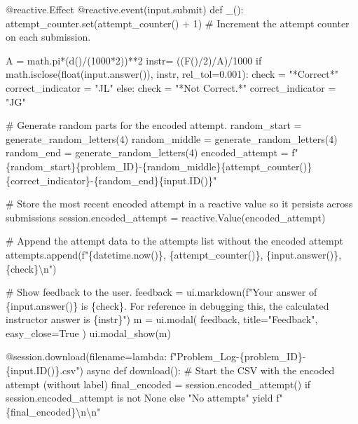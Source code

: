 \documentclass[
  letterpaper,
  DIV=11,
  numbers=noendperiod]{scrreprt}
\newenvironment{Shaded}{\begin{snugshade}}{\end{snugshade}}
\newcommand{\NormalTok}[1]{\textcolor[rgb]{0.00,0.23,0.31}{#1}}
\begin{document}
\begin{Shaded}
\begin{Highlighting}[]
\NormalTok{    @reactive.Effect}
\NormalTok{    @reactive.event(input.submit)}
\NormalTok{    def \_():}
\NormalTok{        attempt\_counter.set(attempt\_counter() + 1)  \# Increment the attempt counter on each submission.  }
      
\NormalTok{        A = math.pi*(d()/(1000*2))**2}
\NormalTok{        instr= ((F()/2)/A)/1000}
\NormalTok{        if math.isclose(float(input.answer()), instr, rel\_tol=0.001):}
\NormalTok{            check = "*Correct*"}
\NormalTok{            correct\_indicator = "JL"}
\NormalTok{        else:}
\NormalTok{            check = "*Not Correct.*"}
\NormalTok{            correct\_indicator = "JG"}

\NormalTok{        \# Generate random parts for the encoded attempt.}
\NormalTok{        random\_start = generate\_random\_letters(4)}
\NormalTok{        random\_middle = generate\_random\_letters(4)}
\NormalTok{        random\_end = generate\_random\_letters(4)}
\NormalTok{        encoded\_attempt = f"\{random\_start\}\{problem\_ID\}{-}\{random\_middle\}\{attempt\_counter()\}\{correct\_indicator\}{-}\{random\_end\}\{input.ID()\}"}

\NormalTok{        \# Store the most recent encoded attempt in a reactive value so it persists across submissions}
\NormalTok{        session.encoded\_attempt = reactive.Value(encoded\_attempt)}

\NormalTok{        \# Append the attempt data to the attempts list without the encoded attempt}
\NormalTok{        attempts.append(f"\{datetime.now()\}, \{attempt\_counter()\}, \{input.answer()\}, \{check\}\textbackslash{}n")}

\NormalTok{        \# Show feedback to the user.}
\NormalTok{        feedback = ui.markdown(f"Your answer of \{input.answer()\} is \{check\}. For reference in debugging this, the calculated instructor answer is \{instr\}")}
\NormalTok{        m = ui.modal(}
\NormalTok{            feedback,}
\NormalTok{            title="Feedback",}
\NormalTok{            easy\_close=True}
\NormalTok{        )}
\NormalTok{        ui.modal\_show(m)}

\NormalTok{    @session.download(filename=lambda: f"Problem\_Log{-}\{problem\_ID\}{-}\{input.ID()\}.csv")}
\NormalTok{    async def download():}
\NormalTok{        \# Start the CSV with the encoded attempt (without label)}
\NormalTok{        final\_encoded = session.encoded\_attempt() if session.encoded\_attempt is not None else "No attempts"}
\NormalTok{        yield f"\{final\_encoded\}\textbackslash{}n\textbackslash{}n"}
        

\end{Highlighting}
\end{Shaded}
\end{document}
